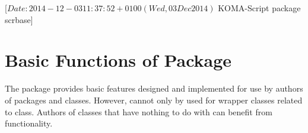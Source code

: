 %
%
%
%
%
%
%
%
% 
%
%
%
%

                 [$Date: 2014-12-03 11:37:52 +0100 (Wed, 03 Dec 2014) $
                  KOMA-Script package scrbase]


\chapter{Basic Functions of Package }

%

The package  provides basic features designed and implemented
for use by authors of packages and classes. However,  cannot
only by used for wrapper classes related to \KOMAScript{} class. Authors of
classes that have nothing to do with \KOMAScript{} can benefit from
 functionality.

